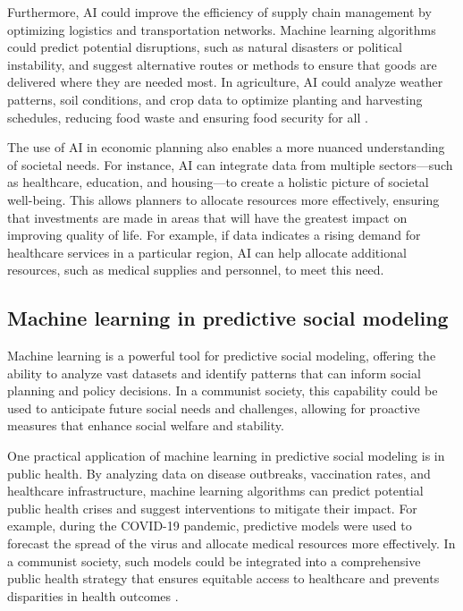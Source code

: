 Furthermore, AI could improve the efficiency of supply chain management by optimizing logistics and transportation networks. Machine learning algorithms could predict potential disruptions, such as natural disasters or political instability, and suggest alternative routes or methods to ensure that goods are delivered where they are needed most. In agriculture, AI could analyze weather patterns, soil conditions, and crop data to optimize planting and harvesting schedules, reducing food waste and ensuring food security for all \cite[pp.~88-91]{Brynjolfsson2014TheSecondMachineAge}.

The use of AI in economic planning also enables a more nuanced understanding of societal needs. For instance, AI can integrate data from multiple sectors—such as healthcare, education, and housing—to create a holistic picture of societal well-being. This allows planners to allocate resources more effectively, ensuring that investments are made in areas that will have the greatest impact on improving quality of life. For example, if data indicates a rising demand for healthcare services in a particular region, AI can help allocate additional resources, such as medical supplies and personnel, to meet this need.

\subsection{Machine learning in predictive social modeling}

Machine learning is a powerful tool for predictive social modeling, offering the ability to analyze vast datasets and identify patterns that can inform social planning and policy decisions. In a communist society, this capability could be used to anticipate future social needs and challenges, allowing for proactive measures that enhance social welfare and stability.

One practical application of machine learning in predictive social modeling is in public health. By analyzing data on disease outbreaks, vaccination rates, and healthcare infrastructure, machine learning algorithms can predict potential public health crises and suggest interventions to mitigate their impact. For example, during the COVID-19 pandemic, predictive models were used to forecast the spread of the virus and allocate medical resources more effectively. In a communist society, such models could be integrated into a comprehensive public health strategy that ensures equitable access to healthcare and prevents disparities in health outcomes \cite[pp.~58-60]{Kucharski2020RulesOfContagion}.

